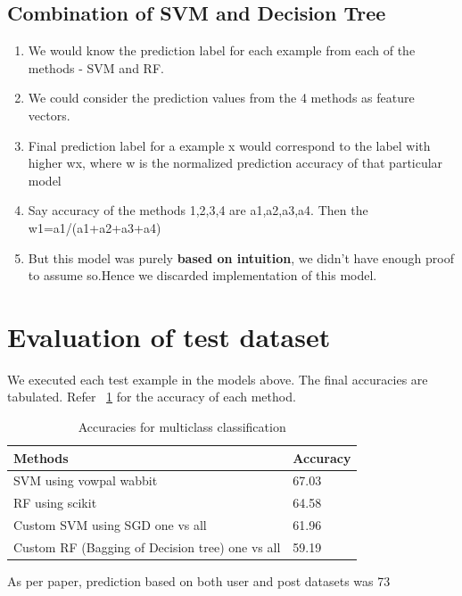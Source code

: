 \documentclass[letterpaper,twocolumn,11pt]{article}
\begin{document}
\subsection{Combination of SVM and Decision Tree}
\begin{enumerate}
\itemsep0em
\item We would know the prediction label for each example from each of the methods - SVM and RF.
\item We could consider the prediction values from the 4 methods  as feature vectors.
\item Final prediction label for a example x would correspond to the label with higher wx, where w is the normalized prediction accuracy of that particular model
\item Say accuracy of the methods 1,2,3,4 are a1,a2,a3,a4. Then the w1=a1/(a1+a2+a3+a4)
\item But this model was purely \textbf{based on intuition}, we didn't have enough proof to assume so.Hence we discarded implementation of this model.
\end{enumerate}


\section{Evaluation of test dataset}

We executed each test example in the models above. The final accuracies are tabulated. Refer ~\ref{tab:accuracy} for the accuracy of each method.

\begin{table}[ht] 
\centering
\begin{tabular}{ |p{4.5cm}|p{3cm} |}
\hline
\textbf{Methods} & \textbf{Accuracy}\\ \hline
SVM using vowpal wabbit	&	67.03  \\  \hline
RF using scikit	&	64.58  \\  \hline
Custom SVM using SGD one vs all &  61.96  \\  \hline
Custom RF (Bagging of Decision tree) one vs all &  59.19  \\  \hline
\end{tabular}
\caption{Accuracies for multiclass classification} 
\label{tab:accuracy} 
\end{table} 

As per paper\cite{DBLP:journals/corr/CorreaS13}, prediction based on both user and post datasets was 73%
\end{document}
